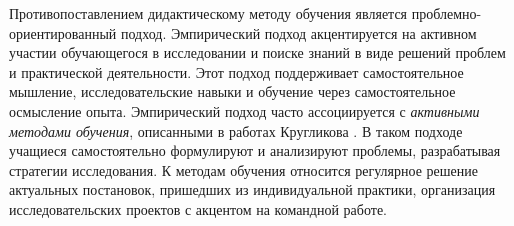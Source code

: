 Противопоставлением дидактическому методу обучения является проблемно-ориентированный подход.
Эмпирический подход акцентируется на активном участии обучающегося в исследовании и поиске знаний в виде решений проблем и практической деятельности.
Этот подход поддерживает самостоятельное мышление, исследовательские навыки и обучение через самостоятельное осмысление опыта.
Эмпирический подход часто ассоциируется с \textit{активными методами обучения}, описанными в работах Кругликова \cite{кругликов2006деловые}.
В таком подходе учащиеся самостоятельно формулируют и анализируют проблемы, разрабатывая стратегии исследования.
К методам обучения относится регулярное решение актуальных постановок, пришедших из индивидуальной практики, организация исследовательских проектов с
акцентом на командной работе.

